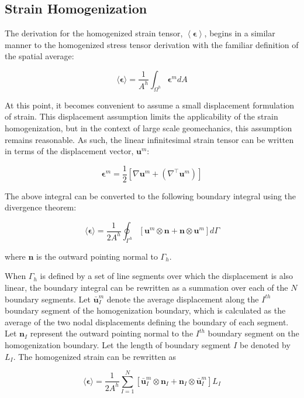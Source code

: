 \subsection{Strain Homogenization}

The derivation for the homogenized strain tensor, $\left< \boldsymbol{\epsilon}\right>$, begins in a similar manner to the homogenized stress tensor derivation with the familiar definition of the spatial average:

\begin{equation}
\langle\boldsymbol{\epsilon}\rangle=\frac{1}{A^{h}}\int_{\Omega^{h}}\boldsymbol{\epsilon}^m dA\label{eqn:strain2}
\end{equation}

At this point, it becomes convenient to assume a small displacement formulation of strain. This displacement assumption limits the applicability of the strain homogenization, but in the context of large scale geomechanics, this assumption remains reasonable. As such, the linear infinitesimal strain tensor can be written in terms of the displacement vector, $\mathbf{u}^m$:

\begin{equation}
\boldsymbol{\epsilon}^m=\frac{1}{2}\left[\nabla\mathbf{u}^m+\left(\nabla^\top \mathbf{u}^m\right)\right]\label{eqn:strain1}
\end{equation}

The above integral can be converted to the following boundary integral using the divergence theorem:

\begin{equation}
\langle\boldsymbol{\epsilon}\rangle=\frac{1}{2A^{h}}\oint_{\Gamma^{h}}\left[\mathbf{u}^m\otimes\mathbf{n}+\mathbf{n}\otimes\mathbf{u}^m\right]d\Gamma\label{eqn:strain5-1}
\end{equation}

where $\mathbf{n}$ is the outward pointing normal to $\Gamma_h$.

When $\Gamma_h$ is defined by a set of line segments over which the displacement is also linear, the boundary integral can be rewritten as a summation over each of the $N$ boundary segments. Let $\bar{\mathbf{u}}^m_{I}$ denote the average displacement along the $I^{th}$ boundary segment of the homogenization boundary, which is calculated as the average of the two nodal displacements defining the boundary of each segment. Let $\mathbf{n}_{I}$ represent the outward pointing normal to the $I^{th}$ boundary segment on the homogenization boundary.  Let the length of boundary segment $I$ be denoted by $L_{I}$. The homogenized strain can be rewritten as

\begin{equation}
\langle\boldsymbol{\epsilon}\rangle=\frac{1}{2A^{h}}\sum_{I=1}^{N}\left[\bar{\mathbf{u}}^m_{I}\otimes\mathbf{n}_{I}+\mathbf{n}_{I}\otimes\bar{\mathbf{u}}^m_{I}\right]L_{I}\label{eqn:strain7}
\end{equation}
